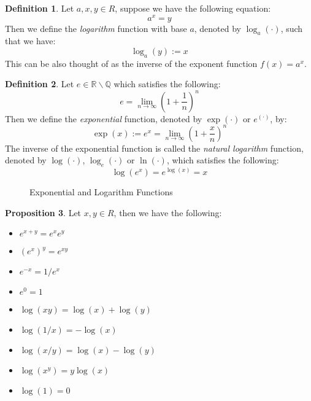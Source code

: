 \documentclass[11pt]{article}
\theoremstyle{definition}
\newtheorem{prop}{Proposition}[section]
\newtheorem{defn}[prop]{Definition}
\newcommand{\brac}[1]{\left(#1\right)}
\newcommand{\R}{\mathbb{R}}
\newcommand{\Q}{\mathbb{Q}}
\begin{document}
	\begin{defn}
		Let $a,x,y\in R$, suppose we have the following equation: 
		$$ a^x = y$$
		Then we define the \emph{logarithm} function with base $a$, denoted by $\log_a\brac{\cdot}$, such that we have:
		$$ \log_a\brac{y} := x$$
		This can be also thought of as the inverse of the exponent function $f\brac{x} = a^x$.
	\end{defn}
	\begin{defn}
		Let $e\in \R \backslash \Q$ which satisfies the following:
		$$ e = \lim_{n\rightarrow\infty}\brac{1+\frac{1}{n}}^n$$
		Then we define the \emph{exponential} function, denoted by $\exp\brac{\cdot}$ or $e^{\brac{\cdot}}$, by:
		$$ \exp\brac{x} := e^x = \lim_{n\rightarrow\infty}\brac{1+\frac{x}{n}}^n$$
		The inverse of the exponential function is called the \emph{natural logarithm} function, denoted by $\log\brac{\cdot}$, $\log_e\brac{\cdot}$ or $\ln\brac{\cdot}$, which satisfies the following:
		$$\log\brac{e^x} = e^{\log\brac{x}} = x$$
		\begin{figure}[H]
			\centering
			\caption{Exponential and Logarithm Functions}
			\label{expLogGraph}
		\end{figure}
	\end{defn}
	\begin{prop}
		Let $x,y\in R$, then we have the following:
		\begin{itemize}
			\item $e^{x+y} = e^x e^y$
			\item $\brac{e^x}^y = e^{xy}$
			\item $e^{-x} = 1/e^x$
			\item $e^0 = 1$
			\item $\log\brac{xy} = \log\brac{x} + \log\brac{y}$
			\item $\log\brac{1/x} = -\log\brac{x}$
			\item $\log\brac{x/y} = \log\brac{x} - \log\brac{y}$
			\item $\log\brac{x^y} = y\log\brac{x}$
			\item $\log\brac{1} = 0$
		\end{itemize}
	\end{prop}
\end{document}
